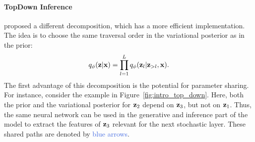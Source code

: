 \paragraph{TopDown Inference}
\citet{sonderby2016ladder} proposed a different decomposition, which has a more efficient implementation. The idea is to choose the same traversal order in the variational posterior as in the prior:
\begin{equation}
    q_{\phi}({\mathbf{z}}|{\mathbf{x}}) = \prod_{l=1}^L q_{\phi}({\mathbf{z}}_l|{\mathbf{z}}_{>l}, {\mathbf{x}}).
\end{equation}
The first advantage of this decomposition is the potential for parameter sharing. 
For instance, consider the example in Figure~\ref{fig:intro_top_down}.
Here, both the prior and the variational posterior for ${\mathbf{z}}_2$ depend on ${\mathbf{z}}_3$, but not on ${\mathbf{z}}_1$. 
Thus, the same neural network can be used in the generative and inference part of the model to extract the features of ${\mathbf{z}}_3$ relevant for the next stochastic layer. 
These shared paths are denoted by \textcolor{RoyalBlue}{blue arrows}.
